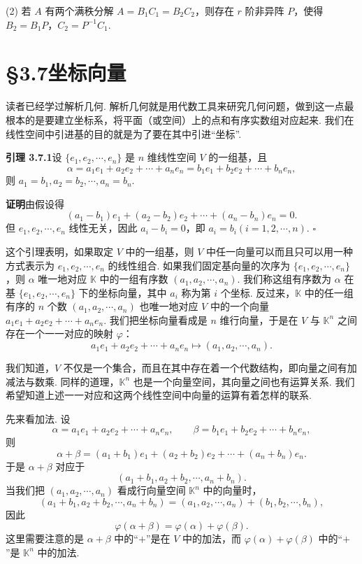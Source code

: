 \documentclass[UTF8,12pt,a4paper,fontset=fandol]{ctexart}
\begin{document}
(2) 若 $A$ 有两个满秩分解 $A=B_1C_1=B_2C_2$，则存在 $r$ 阶非异阵 $P$，使得 $B_2=B_1P$，$C_2=P^{-1}C_1$.

\section*{§3.7\quad 坐标向量}

读者已经学过解析几何. 解析几何就是用代数工具来研究几何问题，做到这一点最根本的是要建立坐标系，将平面（或空间）上的点和有序实数组对应起来. 我们在线性空间中引进基的目的就是为了要在其中引进“坐标”.

\noindent\textbf{引理 3.7.1}\quad 设 $\{e_1,e_2,\cdots,e_n\}$ 是 $n$ 维线性空间 $V$ 的一组基，且
\[
\alpha=a_1e_1+a_2e_2+\cdots+a_ne_n=b_1e_1+b_2e_2+\cdots+b_ne_n,
\]
则 $a_1=b_1,a_2=b_2,\cdots,a_n=b_n$.

\noindent\textbf{证明}\quad 由假设得
\[
(a_1-b_1)e_1+(a_2-b_2)e_2+\cdots+(a_n-b_n)e_n=0.
\]
但 $e_1,e_2,\cdots,e_n$ 线性无关，因此 $a_i-b_i=0$，即 $a_i=b_i(i=1,2,\cdots,n)$. $\square$

这个引理表明，如果取定 $V$ 中的一组基，则 $V$ 中任一向量可以而且只可以用一种方式表示为 $e_1,e_2,\cdots,e_n$ 的线性组合. 如果我们固定基向量的次序为 $\{e_1,e_2,\cdots,e_n\}$，则 $\alpha$ 唯一地对应 $\mathbb{K}$ 中的一组有序数 $(a_1,a_2,\cdots,a_n)$. 我们称这组有序数为 $\alpha$ 在基 $\{e_1,e_2,\cdots,e_n\}$ 下的坐标向量，其中 $a_i$ 称为第 $i$ 个坐标. 反过来，$\mathbb{K}$ 中的任一组有序的 $n$ 个数 $(a_1,a_2,\cdots,a_n)$ 也唯一地对应 $V$ 中的一个向量 $a_1e_1+a_2e_2+\cdots+a_ne_n$. 我们把坐标向量看成是 $n$ 维行向量，于是在 $V$ 与 $\mathbb{K}^n$ 之间存在一个一一对应的映射 $\varphi$：
\[
a_1e_1+a_2e_2+\cdots+a_ne_n\mapsto (a_1,a_2,\cdots,a_n).
\]

我们知道，$V$ 不仅是一个集合，而且在其中存在着一个代数结构，即向量之间有加减法与数乘. 同样的道理，$\mathbb{K}^n$ 也是一个向量空间，其向量之间也有运算关系. 我们希望知道上述一一对应和这两个线性空间中向量的运算有着怎样的联系.

先来看加法. 设
\[
\alpha=a_1e_1+a_2e_2+\cdots+a_ne_n,\qquad
\beta=b_1e_1+b_2e_2+\cdots+b_ne_n,
\]
则
\[
\alpha+\beta=(a_1+b_1)e_1+(a_2+b_2)e_2+\cdots+(a_n+b_n)e_n.
\]
于是 $\alpha+\beta$ 对应于
\[
(a_1+b_1,a_2+b_2,\cdots,a_n+b_n).
\]
当我们把 $(a_1,a_2,\cdots,a_n)$ 看成行向量空间 $\mathbb{K}^n$ 中的向量时，
\[
(a_1+b_1,a_2+b_2,\cdots,a_n+b_n)=(a_1,a_2,\cdots,a_n)+(b_1,b_2,\cdots,b_n),
\]
因此
\[
\varphi(\alpha+\beta)=\varphi(\alpha)+\varphi(\beta).
\]
这里需要注意的是 $\alpha+\beta$ 中的“$+$”是在 $V$ 中的加法，而 $\varphi(\alpha)+\varphi(\beta)$ 中的“$+$”是 $\mathbb{K}^n$ 中的加法.
\end{document}
